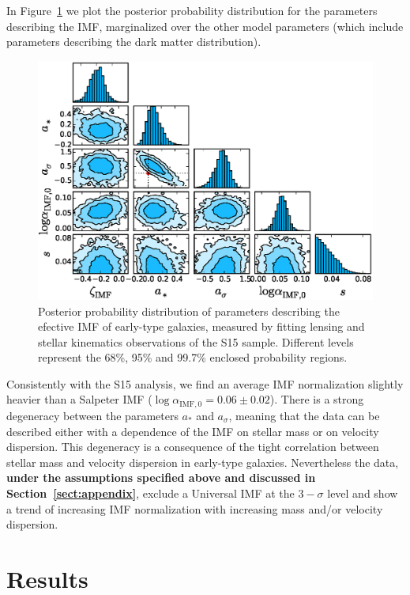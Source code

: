 \documentclass[usenatbib, letters]{mnras}
\def\Sref#1{Section~\ref{#1}\xspace}
\def\Fref#1{Figure~\ref{#1}\xspace}
\begin{document}
In \Fref{fig:sl2scorner} we plot the posterior probability distribution for the parameters describing the IMF, marginalized over the other model parameters (which include parameters describing the dark matter distribution).
%
\begin{figure}
 \includegraphics[width=\textwidth]{imf_pars_nfw_msps_sigma.eps}
 \caption{Posterior probability distribution of parameters describing the efective IMF of early-type galaxies, measured by fitting lensing and stellar kinematics observations of the S15 sample. Different levels represent the 68\%, 95\% and 99.7\% enclosed probability regions.
}
 \label{fig:sl2scorner}
\end{figure}
%
Consistently with the S15 analysis, we find an average IMF normalization slightly heavier than a Salpeter IMF ($\log{\alpha_{\mathrm{IMF},0}} = 0.06\pm0.02$). There is a strong degeneracy between the parameters $a_*$ and $a_\sigma$, meaning that the data can be described either with a dependence of the IMF on stellar mass or on velocity dispersion. This degeneracy is a consequence of the tight correlation between stellar mass and velocity dispersion in early-type galaxies.
Nevertheless the data, {\bf under the assumptions specified above and discussed in \Sref{sect:appendix}}, exclude a Universal IMF at the $3-\sigma$ level and show a trend of increasing IMF normalization with increasing mass and/or velocity dispersion.


\section{Results}\label{sect:results}
\end{document}
